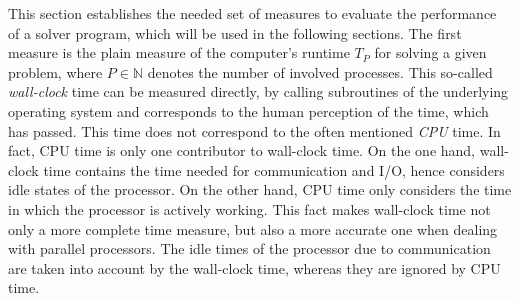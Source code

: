 This section establishes the needed set of measures to evaluate the performance of a solver program, which will be used in the following sections. The first measure is the plain measure of the computer's runtime \(T_P\) for solving a given problem, where \(P \in \mathbb{N}\) denotes the number of involved processes. This so-called \emph{wall-clock} time can be measured directly, by calling subroutines of the underlying operating system and corresponds to the human perception of the time, which has passed. This time does not correspond to the often mentioned \emph{CPU} time. In fact, CPU time is only one contributor to wall-clock time. On the one hand, wall-clock time contains the time needed for communication and I/O, hence considers idle states of the processor. On the other hand, CPU time only considers the time in which the processor is actively working. This fact makes wall-clock time not only a more complete time measure, but also a more accurate one when dealing with parallel processors. The idle times of the processor due to communication are taken into account by the wall-clock time, whereas they are ignored by CPU time.

